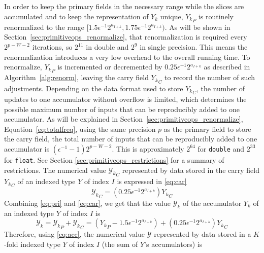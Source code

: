       In order to keep the primary fields in the necessary range while the
      slices are accumulated and to keep the representation of $Y_k$ unique,
      ${Y_k}_P$ is routinely renormalized to the range 
      \(
        [1.5 \epsilon^{-1} 2^{a_{I + k}}, 1.75 \epsilon^{-1} 2^{a_{I + k}}).
      \)
      As will be shown in Section~\ref{sec:primitiveops_renormalize},
      that renormalization is required every $2^{p-W-2}$ iterations,
      so $2^{11}$ in double and $2^9$ in single precision.
      This means the renormalization introduces a very low overhead
      to the overall running time.
      To renormalize, ${Y_k}_P$ is incremented or decremented by
      $0.25 \epsilon^{-1} 2^{a_{I + k}}$ as described in Algorithm~\ref{alg:renorm},
      leaving the carry field ${Y_k}_C$ to record the number of such adjustments.
      Depending on the data format used to store ${Y_k}_C$, the number of
      updates to one accumulator without overflow is limited,
      which determines the possible maximum number of inputs that can be
      reproducibly added to one accumulator.
      As will be explained in Section~\ref{sec:primitiveops_renormalize},
      Equation~\eqref{eq:totalfreq}, using the same precision $p$ as the primary field
      to store the carry field, the total number of inputs
      that can be reproducibly added to one accumulator is 
      $(\epsilon^{-1} - 1)2^{p-W-2}$. This is approximately $2^{64}$ for 
      \texttt{double} and $2^{33}$ for \texttt{float}. See Section 
      \ref{sec:primitiveops_restrictions} for a summary of restrictions.
      The numerical value ${\mathcal{Y}_k}_C$ represented by data stored in the carry field
      ${Y_k}_C$ of an indexed type $Y$ of index $I$ is expressed in
      \eqref{eq:car}
      \begin{equation}
        {\mathcal{Y}_k}_C = (0.25\epsilon^{-1}2^{a_{I + k}}){Y_k}_C
        \label{eq:car}
      \end{equation}
      Combining \eqref{eq:pri} and \eqref{eq:car}, we get that the value $\mathcal{Y}_k$ of the accumulator $Y_k$ of an indexed type $Y$ of index $I$ is
      \begin{equation}
        \mathcal{Y}_k = {\mathcal{Y}_k}_P + {\mathcal{Y}_k}_C = ({Y_k}_P - 1.5 \epsilon^{-1}2^{a_{I + k}}) + (0.25\epsilon^{-1}2^{a_{I + k}}){Y_k}_C
        \label{eq:acc}
      \end{equation}
      Therefore, using  \eqref{eq:acc}, the numerical value $\mathcal{Y}$ represented by data stored in a $K$-fold indexed type $Y$ of index $I$ (the sum of $Y$'s accumulators) is
